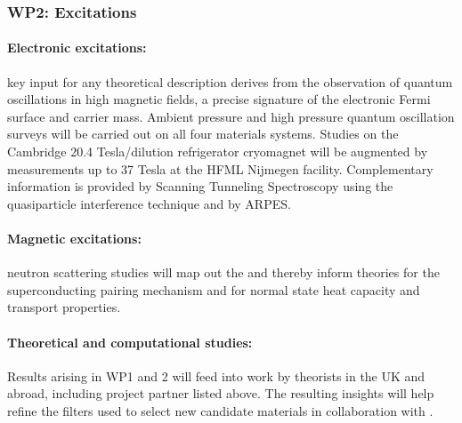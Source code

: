 \subsubsection*{WP2: Excitations}



\paragraph{Electronic excitations:} key input for any
theoretical description derives from the observation of quantum oscillations in high magnetic fields, a precise signature of the electronic Fermi surface and
carrier mass. Ambient pressure and high pressure quantum oscillation surveys will be carried out on all four materials systems.
Studies on the Cambridge 20.4 Tesla/dilution refrigerator cryomagnet will be augmented by measurements up to 37 Tesla at the HFML Nijmegen facility. Complementary information is provided by Scanning Tunneling Spectroscopy using the quasiparticle interference technique and by  ARPES.


\paragraph{Magnetic excitations:}
neutron scattering studies will map out the  and thereby inform theories for the superconducting pairing mechanism and for normal state heat
capacity \cite{hayden00} and transport properties. 


\paragraph{Theoretical and computational studies:}
Results arising in WP1 and 2 will feed into work by theorists in the UK and abroad, including project partner  listed above. %
The resulting insights will help refine the filters used to select new candidate materials in collaboration with .

